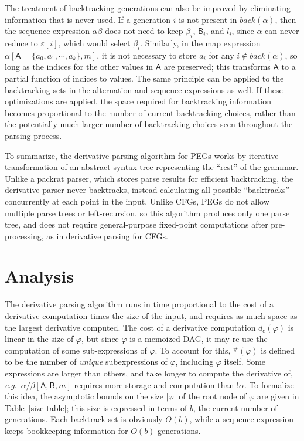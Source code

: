 \documentclass[submission,copyright,creativecommons]{eptcs}
\newcommand{\g}[1]{\mathsf{#1}}
\newcommand{\eg}{\textit{e}.\textit{g}.}
\begin{document}
The treatment of backtracking generations can also be improved by eliminating information that is never used. 
If a generation $i$ is not present in $back(\alpha)$, then the sequence expression $\alpha\beta$ does not need to keep $\beta_i$, $\g{B}_i$, and $l_i$, since $\alpha$ can never reduce to $\varepsilon[i]$, which would select $\beta_i$. 
Similarly, in the map expression $\alpha[\g{A} = \{a_0,a_1,\cdots,a_k\},m]$, it is not necessary to store $a_i$ for any $i \not\in back(\alpha)$, so long as the indices for the other values in $\g{A}$ are preserved; this transforms $\g{A}$ to a partial function of indices to values. 
The same principle can be applied to the backtracking sets in the alternation and sequence expressions as well.
If these optimizations are applied, the space required for backtracking information becomes proportional to the number of current backtracking choices, rather than the potentially much larger number of backtracking choices seen throughout the parsing process.

To summarize, the derivative parsing algorithm for PEGs works by iterative transformation of an abstract syntax tree representing the ``rest'' of the grammar. 
Unlike a packrat parser, which stores parse results for efficient backtracking, the derivative parser never backtracks, instead calculating all possible ``backtracks'' concurrently at each point in the input. 
Unlike CFGs, PEGs do not allow multiple parse trees or left-recursion, so this algorithm produces only one parse tree, and does not require general-purpose fixed-point computations after pre-processing, as in derivative parsing for CFGs.

\section{Analysis}
\label{bounds-sec}
The derivative parsing algorithm runs in time proportional to the cost of a derivative computation times the size of the input, and requires as much space as the largest derivative computed. 
The cost of a derivative computation $d_c(\varphi)$ is linear in the size of $\varphi$, but since $\varphi$ is a memoized DAG, it may re-use the computation of some sub-expressions of $\varphi$. 
To account for this, $^\#(\varphi)$ is defined to be the number of \emph{unique} subexpressions of $\varphi$, including $\varphi$ itself. 
Some expressions are larger than others, and take longer to compute the derivative of, \eg\ $\alpha/\beta[\g{A},\g{B},m]$ requires more storage and computation than $!\alpha$.
To formalize this idea, the asymptotic bounds on the size $|\varphi|$ of the root node of $\varphi$ are given in Table~\ref{size-table}; this size is expressed in terms of $b$, the current number of generations. 
Each backtrack set is obviously $O(b)$, while a sequence expression keeps bookkeeping information for $O(b)$ generations.
\end{document}
